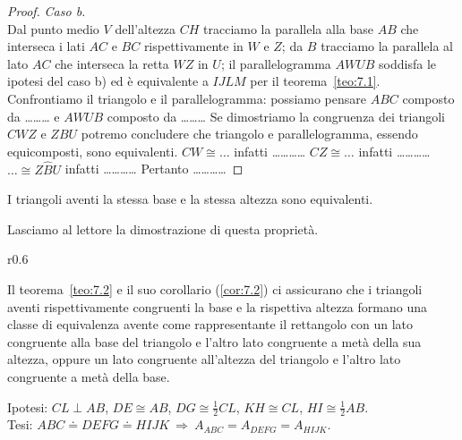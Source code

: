 \begin{proof}
\noindent\begin{minipage}{0.65\textwidth}\parindent15pt
\noindent\emph{Caso b.}\\
Dal punto medio $V$ dell'altezza $CH$ tracciamo la parallela alla 
base $AB$ che interseca i lati $AC$ e $BC$ rispettivamente in $W$ e 
$Z$; da $B$ tracciamo la parallela al lato $AC$ che interseca la retta 
$WZ$ in $U$; il parallelogramma $AWUB$ soddisfa le ipotesi del caso b) 
ed è equivalente a $IJLM$ per il teorema~\ref{teo:7.1}.
Confrontiamo il triangolo e il parallelogramma: possiamo pensare 
$ABC$ composto da \ldots\ldots\ldots{} e $AWUB$ composto da 
\ldots\ldots\ldots{}
Se dimostriamo la congruenza dei triangoli $CWZ$ e $ZBU$ potremo 
concludere che triangolo e parallelogramma, essendo equicomposti, 
sono equivalenti.
$CW\cong \ldots{}$ infatti \ldots\ldots\ldots\ldots{}
$CZ\cong \ldots{}$ infatti \ldots\ldots\ldots\ldots{}
$\ldots{}\cong Z\widehat{B}U$ infatti \ldots\ldots\ldots\ldots{}
Pertanto \ldots\ldots\ldots\ldots{}
\end{minipage}\hfil
\begin{minipage}{0.35\textwidth}
  \centering
\end{minipage}\vspace{1pt}
\end{proof}

\begin{corollario}\label{cor:7.2}
I triangoli aventi la stessa base e la stessa altezza sono 
equivalenti.
\end{corollario}

Lasciamo al lettore la dimostrazione di questa proprietà.

\begin{wrapfigure}{r}{0.6\textwidth}
  \centering
\end{wrapfigure}
Il teorema~\ref{teo:7.2} e il suo corollario (\ref{cor:7.2}) ci 
assicurano che i triangoli aventi rispettivamente congruenti la base 
e la rispettiva altezza formano una classe di equivalenza avente come 
rappresentante il rettangolo con un lato congruente alla base del 
triangolo e l'altro lato congruente a metà della sua altezza, oppure 
un lato congruente all'altezza del triangolo e l'altro lato 
congruente a metà della base. 

\noindent Ipotesi: $CL\perp AB$, $DE\cong AB$, $DG\cong 
\frac{1}{2}CL$, $KH\cong CL$, $HI\cong\frac{1}{2}AB$.\\
Tesi: $ABC\doteq DEFG\doteq HIJK \:\Rightarrow\: 
A_{ABC}=A_{DEFG}=A_{HIJK}$.


